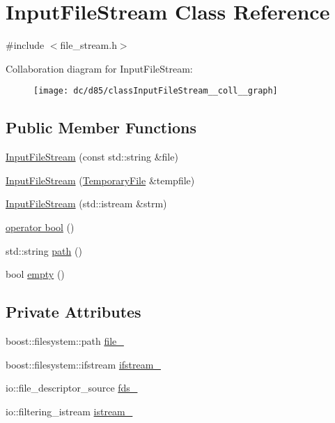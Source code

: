 \hypertarget{classInputFileStream}{}\section{Input\+File\+Stream Class Reference}
\label{classInputFileStream}


{\ttfamily \#include $<$file\+\_\+stream.\+h$>$}



Collaboration diagram for Input\+File\+Stream\+:
\nopagebreak
\begin{figure}[H]
\begin{center}
\leavevmode
\texttt{[image: dc/d85/classInputFileStream\_\_coll\_\_graph]}
\end{center}
\end{figure}
\subsection*{Public Member Functions}
\begin{DoxyCompactItemize}
\item 
\hyperlink{classInputFileStream_af04290c34c232c3e7e6f947833df3dd7}{Input\+File\+Stream} (const std\+::string \&file)
\item 
\hyperlink{classInputFileStream_a8534a6700e1b89a3999ab36d711b0fdf}{Input\+File\+Stream} (\hyperlink{classTemporaryFile}{Temporary\+File} \&tempfile)
\item 
\hyperlink{classInputFileStream_a6563174a509386539e1b9a347b6c78b2}{Input\+File\+Stream} (std\+::istream \&strm)
\item 
\hyperlink{classInputFileStream_a8cf0a5adcc6fae4f3f0244da0c6bddf3}{operator bool} ()
\item 
std\+::string \hyperlink{classInputFileStream_a5298a928a5d19bf88db3c4b9e1e52b45}{path} ()
\item 
bool \hyperlink{classInputFileStream_a3d8e85a070ded9cc9195da0ab93918d5}{empty} ()
\end{DoxyCompactItemize}
\subsection*{Private Attributes}
\begin{DoxyCompactItemize}
\item 
boost\+::filesystem\+::path \hyperlink{classInputFileStream_a2d500667ce04e9dfb7a23308d9ddf76d}{file\+\_\+}
\item 
boost\+::filesystem\+::ifstream \hyperlink{classInputFileStream_a151c433c8d6f4f989438de27328a5ff2}{ifstream\+\_\+}
\item 
io\+::file\+\_\+descriptor\+\_\+source \hyperlink{classInputFileStream_a4571c555900dd34713cddcbffb86b940}{fds\+\_\+}
\item 
io\+::filtering\+\_\+istream \hyperlink{classInputFileStream_a24a2f19b44c9f62116d4242ba8178396}{istream\+\_\+}
\end{DoxyCompactItemize}
